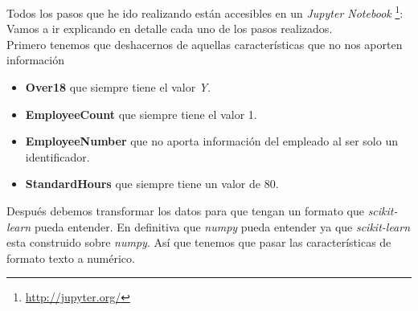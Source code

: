 Todos los pasos que he ido realizando están accesibles en un \textit{Jupyter Notebook} \footnote{\url{http://jupyter.org/}}:
Vamos a ir explicando en detalle cada uno de los pasos realizados.\\



Primero tenemos que deshacernos de aquellas características que no nos aporten información
\begin{itemize}
	\item \textbf{Over18} que siempre tiene el valor \textit{Y}.
	\item \textbf{EmployeeCount} que siempre tiene el valor 1.
	\item \textbf{EmployeeNumber} que no aporta información del empleado al ser solo un identificador.
	\item \textbf{StandardHours} que siempre tiene un valor de 80.
\end{itemize}

Después debemos transformar los datos para que tengan un formato que \textit{scikit-learn} pueda entender. En definitiva que \textit{numpy} pueda entender ya que \textit{scikit-learn} esta construido sobre \textit{numpy}.
Así que tenemos que pasar las características de formato texto a numérico.

